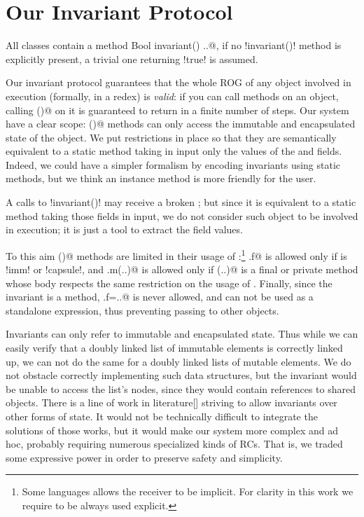 \section{Our Invariant Protocol}
\label{s:protocol}
All classes contain a \Q@read method Bool invariant() {..}@, if no \Q!invariant()! method is explicitly present, a trivial one returning \Q!true! is assumed.

Our invariant protocol guarantees that the whole ROG of any object involved in execution (formally, in a redex) is \emph{valid}: if you can call methods on an object, calling \Q@invariant()@ on it is guaranteed to return \Q@true@ in a finite number of steps.
Our system have a clear scope:
\Q@invariant()@ methods can only access the immutable and encapsulated state of the object.
We put restrictions in place so that they are semantically equivalent to a static method
taking in input only the values of the \Q@imm@ and \Q@capsule@ fields.
Indeed, we could have a simpler formalism by encoding invariants using static methods, but we think an instance method is more friendly for the user.

A calls to \Q!invariant()! may receive a broken \Q@this@; but since it is equivalent to a static method taking those fields in input, we 
do not consider such \Q@this@ object to be involved in execution; it is just a tool to extract the field values.

To this aim \Q@invariant()@ methods are limited in their usage of \Q@this@:\footnote{Some languages allows the \Q@this@ receiver to be implicit. For clarity in this work we require \Q@this@ to be always used explicit.}
\Q@this.f@ is allowed only if \Q@f@ is \Q!imm! or \Q!capsule!, and 
\Q@this.m(..)@ is allowed only if \Q@m(..)@ is a final or private %
method whose body respects the same restriction on the usage of \Q@this@.
Finally, since the invariant is a \Q@read@ method,
\Q@this.f=..@ is never allowed, and \Q@this@ can not be used as a standalone expression, thus preventing passing \Q@this@ to other objects.

Invariants can only refer to immutable and encapsulated state. Thus while we can easily verify that a doubly linked list of immutable elements
is correctly linked up,
we can not do the same for a doubly linked lists of mutable elements. We do not obstacle correctly implementing such data structures, but the invariant would be unable to access the list's nodes, since they would contain \Q@mut@ references to shared objects.
There is a line of work in literature[] striving to allow invariants over other forms of state.
It would not be technically difficult to 
integrate the solutions of those works, but 
it would make our system more complex and ad hoc, probably requiring numerous specialized kinds of RCs.
That is, we traded some expressive power in order to preserve safety and simplicity.



